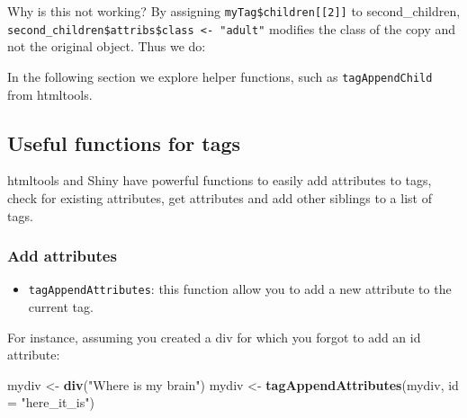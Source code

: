\documentclass[
]{book}
\newenvironment{Shaded}{\begin{snugshade}}{\end{snugshade}}
\newcommand{\DataTypeTok}[1]{\textcolor[rgb]{0.13,0.29,0.53}{#1}}
\newcommand{\DecValTok}[1]{\textcolor[rgb]{0.00,0.00,0.81}{#1}}
\newcommand{\KeywordTok}[1]{\textcolor[rgb]{0.13,0.29,0.53}{\textbf{#1}}}
\newcommand{\NormalTok}[1]{#1}
\newcommand{\OperatorTok}[1]{\textcolor[rgb]{0.81,0.36,0.00}{\textbf{#1}}}
\newcommand{\StringTok}[1]{\textcolor[rgb]{0.31,0.60,0.02}{#1}}
\providecommand{\tightlist}{%
  \setlength{\itemsep}{0pt}\setlength{\parskip}{0pt}}
\begin{document}
Why is this not working? By assigning \texttt{myTag\$children{[}{[}2{]}{]}} to second\_children, \texttt{second\_children\$attribs\$class\ \textless{}-\ "adult"} modifies the class of the copy and not the original object. Thus we do:

\begin{Shaded}
\end{Shaded}

In the following section we explore helper functions, such as \texttt{tagAppendChild} from htmltools.

\hypertarget{useful-functions-for-tags}{%
\subsection{Useful functions for tags}\label{useful-functions-for-tags}}

htmltools and Shiny have powerful functions to easily add attributes to tags, check for existing attributes, get attributes and add other siblings to a list of tags.

\hypertarget{add-attributes}{%
\subsubsection{Add attributes}\label{add-attributes}}

\begin{itemize}
\tightlist
\item
  \texttt{tagAppendAttributes}: this function allow you to add a new attribute to the current tag.
\end{itemize}

For instance, assuming you created a div for which you forgot to add an id attribute:

\begin{Shaded}
\begin{Highlighting}[]
\NormalTok{mydiv <-}\StringTok{ }\KeywordTok{div}\NormalTok{(}\StringTok{"Where is my brain"}\NormalTok{)}
\NormalTok{mydiv <-}\StringTok{ }\KeywordTok{tagAppendAttributes}\NormalTok{(mydiv, }\DataTypeTok{id =} \StringTok{"here_it_is"}\NormalTok{)}
\end{Highlighting}
\end{Shaded}
\end{document}
